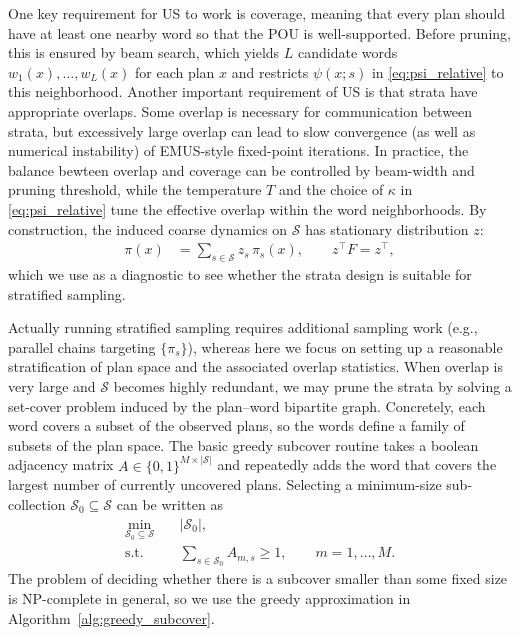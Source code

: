 One key requirement for US to work is coverage, meaning that every plan should have at least one nearby word so that the POU is well-supported.
Before pruning, this is ensured by beam search, which yields $L$ candidate words $w_1(x),\dots,w_L(x)$ for each plan $x$ and restricts $\psi(x;s)$ in \eqref{eq:psi_relative} to this neighborhood.
Another important requirement of US is that strata have appropriate overlaps.
Some overlap is necessary for communication between strata, but excessively large overlap can lead to slow convergence (as well as numerical instability) of EMUS-style fixed-point iterations.
In practice, the balance bewteen overlap and coverage can be controlled by beam-width and pruning threshold, while the temperature $T$ and the choice of $\kappa$ in \eqref{eq:psi_relative} tune the effective overlap within the word neighborhoods.
By construction, the induced coarse dynamics on $\mathcal{S}$ has stationary distribution $z$:
\begin{align}
    \pi(x) &= \sum_{s\in\mathcal{S}} z_s\,\pi_s(x),\qquad
    z^\top F = z^\top,
\end{align}
which we use as a diagnostic to see whether the strata design is suitable for stratified sampling.

Actually running stratified sampling requires additional sampling work (e.g., parallel chains targeting $\{\pi_s\}$), whereas here we focus on setting up a reasonable stratification of plan space and the associated overlap statistics.
When overlap is very large and $\mathcal{S}$ becomes highly redundant, we may prune the strata by solving a set-cover problem induced by the plan--word bipartite graph.
Concretely, each word covers a subset of the observed plans, so the words define a family of subsets of the plan space.
The basic greedy subcover routine takes a boolean adjacency matrix $A\in\{0,1\}^{M\times|\mathcal{S}|}$ and repeatedly adds the word that covers the largest number of currently uncovered plans.
Selecting a minimum-size sub-collection $\mathcal{S}_0\subseteq\mathcal{S}$ can be written as
\begin{align}
    \min_{\mathcal{S}_0\subseteq\mathcal{S}} \quad & |\mathcal{S}_0|,\\
    \text{s.t.}\quad & \sum_{s\in\mathcal{S}_0} A_{m,s} \ge 1,\qquad m=1,\dots,M.
\end{align}
The problem of deciding whether there is a subcover smaller than some fixed size is NP-complete in general, so we use the greedy approximation in Algorithm~\ref{alg:greedy_subcover}.



